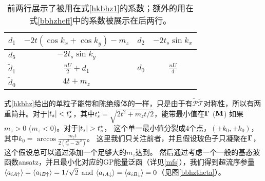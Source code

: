 



\begin{table}[htb]
    \centering
	\caption{前两行展示了被用在式\eqref{hkbhz1}的系数；额外的用在式\eqref{bbhzheff}中的系数被展示在后两行。}
   \label{paramtabBHZ}
	\begin{tabular}{cc|cc}
	\toprule
		$d_1$ & $-2t(\cos k_x +\cos k_y)-m_z$ & $d_{2}$ & $-2t_s\sin k_x$ \\
		\hline
		$d_{5}$ & $-2t_s \sin k_y$ & \\
		\midrule
		$\tilde d_1$ & $\frac{nU}{2}+d_1$ & $d_0$ & $\frac{nU}{4}$ \\
		\hline
		$\tilde d_0$ & $4t+m_z$ &  & \\
		\bottomrule
	\end{tabular}
\end{table}

式\eqref{hkbhz}给出的单粒子能带和陈绝缘体的一样，只是由于有$\tilde{\mathcal P}\tilde{\mathcal T}$对称性，所以有两重简并。对于$\abs{t_s}<t_s^\star$，其中$t_s^\star=\sqrt{2t^2+m_z t/2}$，能带最小值在$\vb \Gamma$ ($\vb M$) 如果 $m_z>0$ ($m_z<0$)。对于$\abs{t_s}>t_s^\star$，
这个单一最小值分裂成4个点，$(\pm k_0,\pm k_0)$，其中$k_0=\arccos\frac{m_z t}{2(t_s^2 -2t^2)}$。
这里我们只关注前者，并且假设玻色子只凝聚在$\vb \Gamma$，
这个假设总可以通过添加一个足够大的$m_z$达到。
然后通过考虑一个一般的基态波函数ansatz，并且最小化对应的GP能量泛函（详见\ref{mfs}），我们得到超流序参量$\expval{a_{iA\uparrow}}=\expval{a_{iB\uparrow}}=1/\sqrt{2}$ and $\expval{a_{iA\downarrow}}=\expval{a_{iB\downarrow}}=0$（见图\ref{bbhztheta}）。

